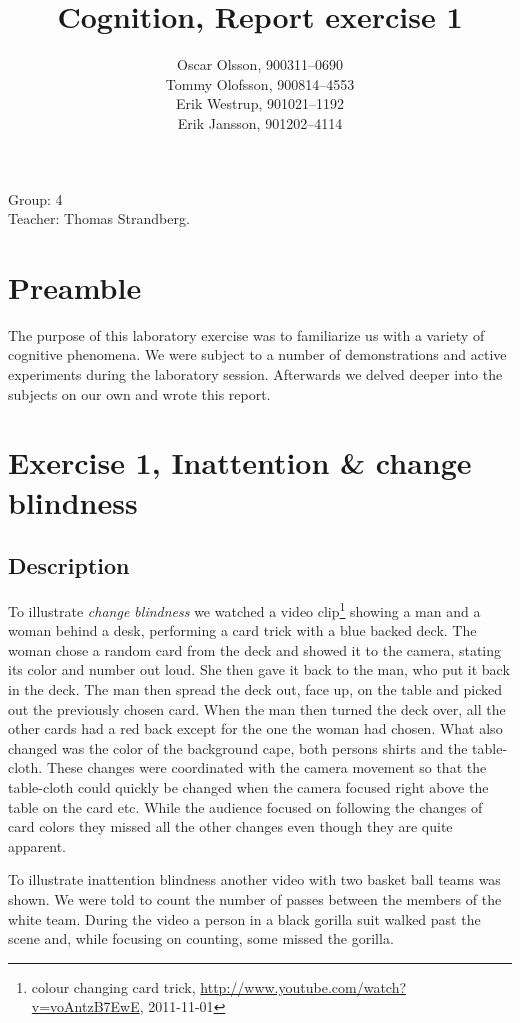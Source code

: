 \documentclass[10pt, a4paper]{article}
\title{Cognition, Report exercise 1}
\date{}
\author{Oscar Olsson, 900311--0690\\ Tommy Olofsson, 900814--4553\\
	Erik Westrup, 901021--1192\\ Erik Jansson, 901202--4114}
\begin{document}
\maketitle
\thispagestyle{empty}
\begin{center}
Group: 4 \\
Teacher: Thomas Strandberg.
\end{center}
\newpage

\section{Preamble}
The purpose of this laboratory exercise was to familiarize us with a variety of cognitive phenomena. We were subject to a number of demonstrations and active experiments during the laboratory session. Afterwards we delved deeper into the subjects on our own and wrote this report.

\section{Exercise 1, Inattention \& change blindness}
\subsection{Description}
To illustrate \emph{change blindness} we watched a video clip\footnote{colour changing card trick, \url{http://www.youtube.com/watch?v=voAntzB7EwE}, 2011-11-01} showing a man and a woman behind a desk, performing a card trick with a blue backed deck. The woman chose a random card from the deck and showed it to the camera, stating its color and number out loud. She then gave it back to the man, who put it back in the deck. The man then spread the deck out, face up, on the table and picked out the previously chosen card. When the man then turned the deck over, all the other cards had a red back except for the one the woman had chosen. What also changed was the color of the background cape, both persons shirts and the table-cloth. These changes were coordinated with the camera movement so that the table-cloth could quickly be changed when the camera focused right above the table on the card etc. While the audience focused on following the changes of card colors they missed all the other changes even though they are quite apparent.

To illustrate inattention blindness another video with two basket ball teams was shown. We were told to count the number of passes between the members of the white team. During the video a person in a black gorilla suit walked past the scene and, while focusing on counting, some missed the gorilla.
\end{document}
